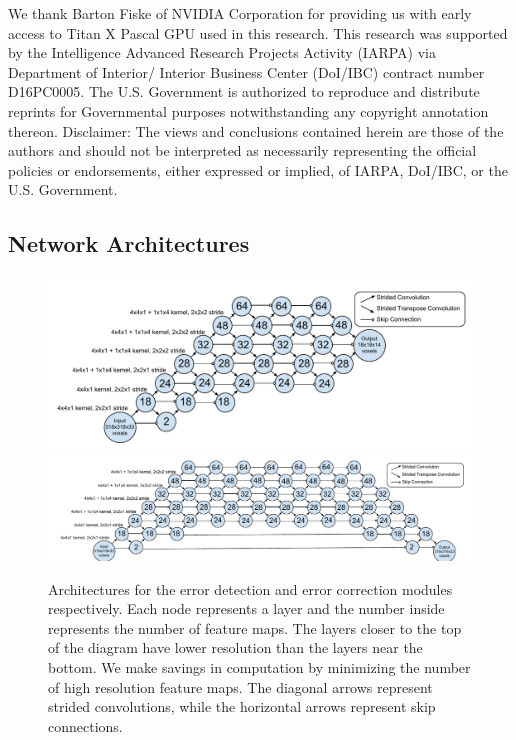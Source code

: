 \documentclass{article}
\begin{document}
We thank Barton Fiske of NVIDIA Corporation for providing us with early access to Titan X
Pascal GPU used in this research. This research was supported by the Intelligence Advanced
Research Projects Activity (IARPA) via Department of Interior/ Interior Business Center (DoI/IBC)
contract number D16PC0005. The U.S. Government is authorized to reproduce and distribute reprints
for Governmental purposes notwithstanding any copyright annotation thereon. Disclaimer: The views
and conclusions contained herein are those of the authors and should not be interpreted as necessarily
representing the official policies or endorsements, either expressed or implied, of IARPA, DoI/IBC,
or the U.S. Government.


\begin{appendices}
\section{Network Architectures}
\label{appendix:architecture}

\begin{figure}
\centering
\includegraphics[width=1.0\linewidth]{error_detector.pdf}
\centering
\includegraphics[width=1.0\linewidth]{error_corrector.pdf}

\caption{Architectures for the error detection and error correction modules respectively. Each node represents a layer and the number inside represents the number of feature maps. The layers closer to the top of the diagram have lower resolution than the layers near the bottom. We make savings in computation by minimizing the number of high resolution feature maps. The diagonal arrows represent strided convolutions, while the horizontal arrows represent skip connections.}
\label{fig:architecture}
\end{figure}


\end{appendices}
\end{document}
